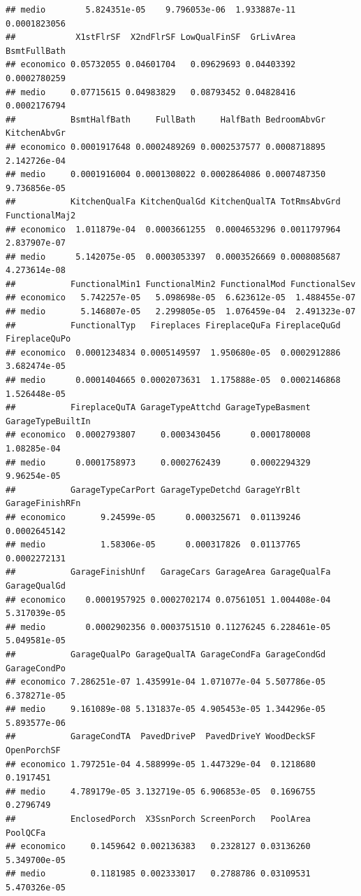\documentclass[
]{article}
\begin{document}
\begin{verbatim}
## medio        5.824351e-05    9.796053e-06  1.933887e-11    0.0001823056
##            X1stFlrSF  X2ndFlrSF LowQualFinSF  GrLivArea BsmtFullBath
## economico 0.05732055 0.04601704   0.09629693 0.04403392 0.0002780259
## medio     0.07715615 0.04983829   0.08793452 0.04828416 0.0002176794
##           BsmtHalfBath     FullBath     HalfBath BedroomAbvGr KitchenAbvGr
## economico 0.0001917648 0.0002489269 0.0002537577 0.0008718895 2.142726e-04
## medio     0.0001916004 0.0001308022 0.0002864086 0.0007487350 9.736856e-05
##           KitchenQualFa KitchenQualGd KitchenQualTA TotRmsAbvGrd FunctionalMaj2
## economico  1.011879e-04  0.0003661255  0.0004653296 0.0011797964   2.837907e-07
## medio      5.142075e-05  0.0003053397  0.0003526669 0.0008085687   4.273614e-08
##           FunctionalMin1 FunctionalMin2 FunctionalMod FunctionalSev
## economico   5.742257e-05   5.098698e-05  6.623612e-05  1.488455e-07
## medio       5.146807e-05   2.299805e-05  1.076459e-04  2.491323e-07
##           FunctionalTyp   Fireplaces FireplaceQuFa FireplaceQuGd FireplaceQuPo
## economico  0.0001234834 0.0005149597  1.950680e-05  0.0002912886  3.682474e-05
## medio      0.0001404665 0.0002073631  1.175888e-05  0.0002146868  1.526448e-05
##           FireplaceQuTA GarageTypeAttchd GarageTypeBasment GarageTypeBuiltIn
## economico  0.0002793807     0.0003430456      0.0001780008       1.08285e-04
## medio      0.0001758973     0.0002762439      0.0002294329       9.96254e-05
##           GarageTypeCarPort GarageTypeDetchd GarageYrBlt GarageFinishRFn
## economico       9.24599e-05      0.000325671  0.01139246    0.0002645142
## medio           1.58306e-05      0.000317826  0.01137765    0.0002272131
##           GarageFinishUnf   GarageCars GarageArea GarageQualFa GarageQualGd
## economico    0.0001957925 0.0002702174 0.07561051 1.004408e-04 5.317039e-05
## medio        0.0002902356 0.0003751510 0.11276245 6.228461e-05 5.049581e-05
##           GarageQualPo GarageQualTA GarageCondFa GarageCondGd GarageCondPo
## economico 7.286251e-07 1.435991e-04 1.071077e-04 5.507786e-05 6.378271e-05
## medio     9.161089e-08 5.131837e-05 4.905453e-05 1.344296e-05 5.893577e-06
##           GarageCondTA  PavedDriveP  PavedDriveY WoodDeckSF OpenPorchSF
## economico 1.797251e-04 4.588999e-05 1.447329e-04  0.1218680   0.1917451
## medio     4.789179e-05 3.132719e-05 6.906853e-05  0.1696755   0.2796749
##           EnclosedPorch  X3SsnPorch ScreenPorch   PoolArea     PoolQCFa
## economico     0.1459642 0.002136383   0.2328127 0.03136260 5.349700e-05
## medio         0.1181985 0.002333017   0.2788786 0.03109531 5.470326e-05

\end{verbatim}
\end{document}
